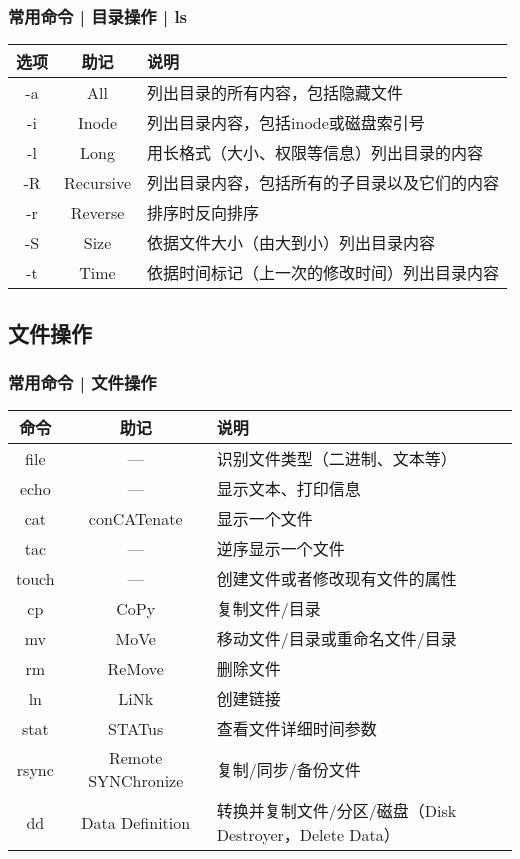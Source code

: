 \begin{frame}
  \frametitle{常用命令 | 目录操作 | \alert{ls}}
  \begin{table}
    \centering
    \begin{tabular}{ccl}
      \hline
      \rowcolor{blue!50}选项 & 助记 & 说明\\
      \hline
      -a & All & 列出目录的所有内容，包括隐藏文件\\
      -i & Inode & 列出目录内容，包括inode或磁盘索引号\\
      -l & Long & 用长格式（大小、权限等信息）列出目录的内容\\
      -R & Recursive & 列出目录内容，包括所有的子目录以及它们的内容\\
      -r & Reverse & 排序时反向排序\\
      -S & Size & 依据文件大小（由大到小）列出目录内容\\
      -t & Time & 依据时间标记（上一次的修改时间）列出目录内容\\
      \hline
    \end{tabular}
  \end{table}
\end{frame}

\subsection{文件操作}
\begin{frame}
  \frametitle{常用命令 | \alert{文件操作}}
  \begin{table}
    \centering
    \begin{tabularx}{\textwidth}{ccX}
      \hline
      \rowcolor{blue!50}命令 & 助记 & 说明\\
      \hline
      file & --- & 识别文件类型（二进制、文本等）\\
      echo & --- &  显示文本、打印信息\\
      cat & conCATenate & 显示一个文件\\
      tac & --- & 逆序显示一个文件\\
      touch & --- & 创建文件或者修改现有文件的属性\\
      cp & CoPy & 复制文件/目录\\
      mv & MoVe & 移动文件/目录或重命名文件/目录\\
      rm & ReMove & 删除文件\\
      ln & LiNk & 创建链接\\
      stat & STATus & 查看文件详细时间参数\\
      \hline
      rsync & Remote SYNChronize & 复制/同步/备份文件\\
      dd & Data Definition & 转换并复制文件/分区/磁盘（Disk Destroyer，Delete Data）\\
      \hline
    \end{tabularx}
  \end{table}
\end{frame}

